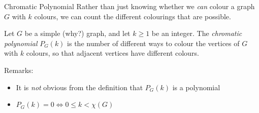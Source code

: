 \documentclass{beamer}
\begin{document}
\begin{frame}{Chromatic Polynomial}
  Rather than just knowing whether we \emph{can} colour a graph $G$ with $k$ colours, we can count the different colourings that are possible.

  \begin{definition}Let $G$ be a simple (why?) graph, and let $k\geq 1$ be an integer.  The \emph{chromatic polynomial} $P_G(k)$ is the number of different ways to colour the vertices of $G$ with $k$ colours, so that adjacent vertices have different colours.
  \end{definition}

  \begin{block}{Remarks:}
    \begin{itemize}
    \item It is \emph{not} obvious from the definition that $P_G(k)$ is a polynomial
    \item $P_G(k)=0\iff 0\leq k <\chi(G)$
    \end{itemize}
    \end{block}
\end{frame}  
\end{document}
